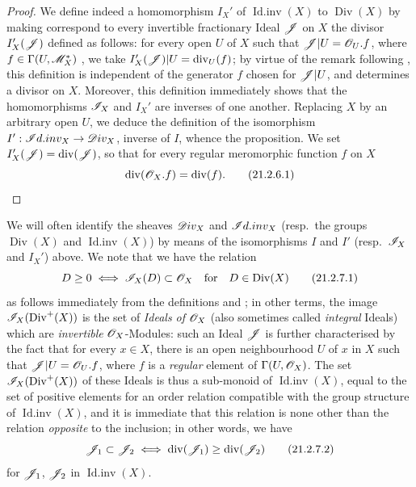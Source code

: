 \begin{proof}
We define indeed a homomorphism $I_X'$ of $\operatorname{Id.inv}(X)$ to $\operatorname{Div}(X)$ by making correspond to every invertible fractionary Ideal $\mathscr{J}$ on $X$ the divisor $I_X'(\mathscr{J})$ defined as follows:
for every open $U$ of $X$ such that $\mathscr{J}|U=\mathscr{O}_U.f$, where $f\in\Gamma(U,\mathscr{M}_X^*)$ , we take $I_X'(\mathscr{J})|U=\operatorname{div}_U(f)$;
by virtue of the remark following , this definition is independent of the generator $f$ chosen for $\mathscr{J}|U$, and determines a divisor on $X$.
Moreover, this definition immediately shows that the homomorphisms $\mathscr{I}_X$ and $I_X'$ are inverses of one another.
Replacing $X$ by an arbitrary open $U$, we deduce the definition of the isomorphism $I':\mathscr{I}d.inv_X\to\mathscr{D}iv_X$, inverse of $I$, whence the proposition.
We set $I_X'(\mathscr{J})=\operatorname{div}(\mathscr{J})$, so that for every regular meromorphic function $f$ on $X$
\[
\label{IV.21.2.6.1}
  \operatorname{div}(\mathscr{O}_X.f)=\operatorname{div}(f).
  \tag{21.2.6.1}
\]
\end{proof}

\begin{env}[21.2.7]
\label{IV.21.2.7}
We will often identify the sheaves $\mathscr{D}iv_X$ and $\mathscr{I}d.inv_X$ (resp.\ the groups $\operatorname{Div}(X)$ and $\operatorname{Id.inv}(X)$) by means of the isomorphisms $I$ and $I'$ (resp.\ $\mathscr{I}_X$ and $I_X'$) above.
We note that we have the relation
\[
\label{IV.21.2.7.1}
  D\geq 0 \iff \mathscr{I}_X(D)\subset\mathscr{O}_X \quad\text{for}\quad D\in\operatorname{Div}(X)
  \tag{21.2.7.1}
\]
as follows immediately from the definitions  and ;
in other terms, the image $\mathscr{I}_X(\operatorname{Div}^+(X))$ is the set of \emph{Ideals of} $\mathscr{O}_X$ (also sometimes called \emph{integral} Ideals) which are \emph{invertible} $\mathscr{O}_X$-Modules:
such an Ideal $\mathscr{J}$ is further characterised by the fact that for every $x\in X$, there is an open neighbourhood $U$ of $x$ in $X$ such that $\mathscr{J}|U=\mathscr{O}_U.f$, where $f$ is a \emph{regular} element of $\Gamma(U,\mathscr{O}_X)$.
The set $\mathscr{I}_X(\operatorname{Div}^+(X))$ of these Ideals is thus a sub-monoid of $\operatorname{Id.inv}(X)$, equal to the set of positive elements for an order relation compatible with the group structure of $\operatorname{Id.inv}(X)$, and it is immediate that this relation is none other than the relation \emph{opposite} to the inclusion;
in other words, we have
\[
\label{IV.21.2.7.2}
  \mathscr{J}_1\subset\mathscr{J}_2 \iff \operatorname{div}(\mathscr{J}_1)\geq\operatorname{div}(\mathscr{J}_2)
  \tag{21.2.7.2}
\]
for $\mathscr{J}_1$, $\mathscr{J}_2$ in $\operatorname{Id.inv}(X)$.
\end{env}

